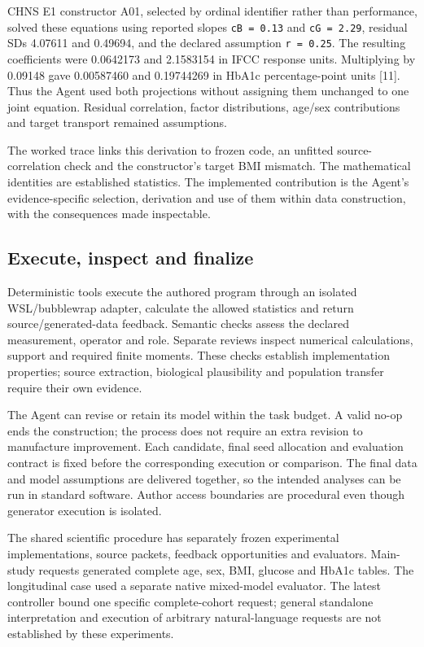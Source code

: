 \documentclass[10pt,twocolumn]{article}
\begin{document}
CHNS E1 constructor A01, selected by ordinal identifier rather than performance, solved these equations using reported slopes \texttt{cB = 0.13} and \texttt{cG = 2.29}, residual SDs 4.07611 and 0.49694, and the declared assumption \texttt{r = 0.25}. The resulting coefficients were 0.0642173 and 2.1583154 in IFCC response units. Multiplying by 0.09148 gave 0.00587460 and 0.19744269 in HbA1c percentage-point units [11]. Thus the Agent used both projections without assigning them unchanged to one joint equation. Residual correlation, factor distributions, age/sex contributions and target transport remained assumptions.


The worked trace links this derivation to frozen code, an unfitted source-correlation check and the constructor's target BMI mismatch. The mathematical identities are established statistics. The implemented contribution is the Agent's evidence-specific selection, derivation and use of them within data construction, with the consequences made inspectable.


\subsection{Execute, inspect and finalize}

Deterministic tools execute the authored program through an isolated WSL/bubblewrap adapter, calculate the allowed statistics and return source/generated-data feedback. Semantic checks assess the declared measurement, operator and role. Separate reviews inspect numerical calculations, support and required finite moments. These checks establish implementation properties; source extraction, biological plausibility and population transfer require their own evidence.


The Agent can revise or retain its model within the task budget. A valid no-op ends the construction; the process does not require an extra revision to manufacture improvement. Each candidate, final seed allocation and evaluation contract is fixed before the corresponding execution or comparison. The final data and model assumptions are delivered together, so the intended analyses can be run in standard software. Author access boundaries are procedural even though generator execution is isolated.


The shared scientific procedure has separately frozen experimental implementations, source packets, feedback opportunities and evaluators. Main-study requests generated complete age, sex, BMI, glucose and HbA1c tables. The longitudinal case used a separate native mixed-model evaluator. The latest controller bound one specific complete-cohort request; general standalone interpretation and execution of arbitrary natural-language requests are not established by these experiments.
\end{document}
